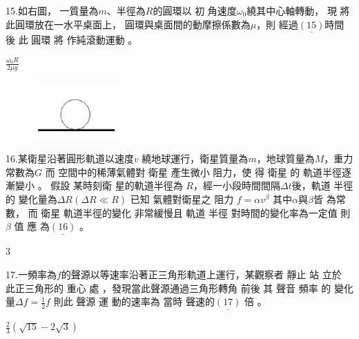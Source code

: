 \documentclass[cn,10pt,math=newtx,chinesefont=founder,device=ig]{elegantbook}
\begin{document}
\newpage


\begin{example}
   15.如右圖， 一質量為$m$、半徑為$R$的圓環以 初 角速度$\omega_0$繞其中心軸轉動，
現 將此圓環放在一水平桌面上， 圓環與桌面間的動摩擦係數為$\mu$，則
經過$\underline{(15)}$時間 後 此 圓環 將 作純滾動運動 。\\
    \rightline{[文華高中教甄109]}
\end{example}
\begin{solution}
    $\frac{\omega_0 R}{2\mu g}$
\end{solution}
\begin{figure}[htbp]
    \flushright
    \includegraphics[width=0.3\textwidth]{image/109文華15.png}
  \end{figure}
\newpage


\begin{example}
   16.某衛星沿著圓形軌道以速度$v$ 繞地球運行，衛星質量為$m$，地球質量為$M$，重力常數為$G$
而 空間中的稀薄氣體對 衛星 產生微小 阻力，使 得 衛星 的 軌道半徑逐漸變小 。 假設 某時刻衛
星的軌道半徑為 $R$，經一小段時間間隔$\Delta t$後，軌道 半徑的 變化量為$\Delta R (\Delta R \ll R)$ 已知 氣體對衛星之 阻力 $f=\alpha v^\beta$ 其中$\alpha$與$\beta$皆 為常數， 而 衛星 軌道半徑的變化 非常緩慢且 軌道
半徑 對時間的變化率為一定值 則$\beta$ 值 應 為$\underline{(16)}$ 。\\
    \rightline{[文華高中教甄109]}
\end{example}
\begin{solution}
    $3$
\end{solution}

\newpage


\begin{example}
   17.一頻率為$f$的聲源以等速率沿著正三角形軌道上運行，某觀察者 靜止 站 立於 此正三角形的
重心 處 ，發現當此聲源通過三角形轉角 前後 其 聲音 頻率 的 變化量$\Delta f= \frac{1}{2}f$ 則此 聲源 運 動的速率為 當時 聲速的$\underline{(17)}$ 倍 。\\
    \rightline{[文華高中教甄109]}
\end{example}
\begin{solution}
    $\frac{2}{3}(\sqrt{15}-2\sqrt{3})$
\end{solution}
\end{document}
